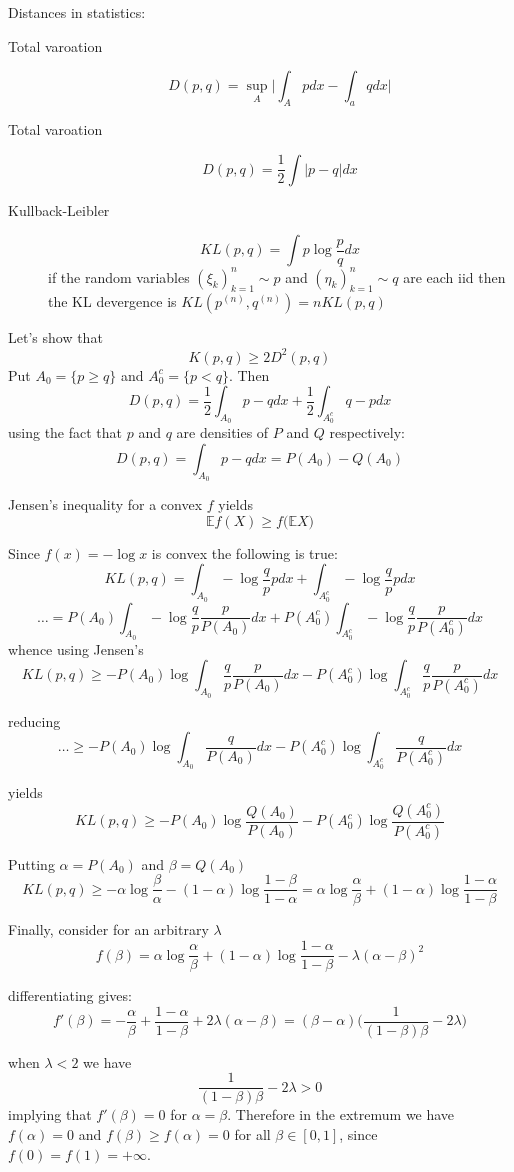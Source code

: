 \documentclass[a4paper]{article}
\newcommand{\Ex}{\mathbb{E}}
\begin{document}
Distances in statistics:
\begin{description}
	\item[Total varoation] \[D(p,q) = \sup_A\Big\lvert \int_A p dx -  \int_a q dx \Big\rvert\]
	\item[Total varoation] \[D(p,q) = \frac{1}{2}\int|p-q| dx\]
	\item[Kullback-Leibler] \[KL(p,q) = \int p\log\frac{p}{q} dx \]
	if the random variables $(\xi_k)_{k=1}^n\sim p$ and $(\eta_k)_{k=1}^n\sim q$ are each iid then the KL devergence is $KL(p^{(n)},q^{(n)}) = n KL(p,q)$
\end{description}

Let's show that
\[K(p,q)\geq 2 D^2(p,q)\]
Put $A_0 = \{ p \geq q \}$ and $A_0^c = \{p < q\}$. Then 
\[D(p,q) = \frac{1}{2}\int_{A_0} p-q dx + \frac{1}{2}\int_{A_0^c} q - p dx \]
using the fact that $p$ and $q$ are densities of $P$ and $Q$ respectively:
\[D(p,q) = \int_{A_0} p-q dx = P(A_0) - Q(A_0)\]

Jensen's inequality for a convex $f$ yields
\[\Ex f(X) \geq f\big(\Ex X\big)\]

Since $f(x) = -\log x$ is convex the following is true:
\[KL(p,q) = \int_{A_0} -\log\frac{q}{p} p dx + \int_{A_0^c} -\log\frac{q}{p} p dx \]
\[\ldots = P(A_0) \int_{A_0} -\log\frac{q}{p} \frac{p}{P(A_0)} dx + P(A_0^c) \int_{A_0^c} -\log\frac{q}{p} \frac{p}{P(A_0^c)} dx \]
whence using Jensen's
\[KL(p,q) \geq  -P(A_0) \log \int_{A_0}\frac{q}{p} \frac{p}{P(A_0)} dx - P(A_0^c) \log \int_{A_0^c} \frac{q}{p} \frac{p}{P(A_0^c)} dx\]

reducing
\[\ldots \geq -P(A_0) \log \int_{A_0}\frac{q}{P(A_0)} dx -P(A_0^c) \log \int_{A_0^c} \frac{q}{P(A_0^c)} dx \]

yields
\[KL(p,q) \geq -P(A_0) \log \frac{Q(A_0)}{P(A_0)} -P(A_0^c) \log \frac{Q(A_0^c)}{P(A_0^c)} \]

Putting $\alpha = P(A_0)$ and $\beta = Q(A_0)$
\[KL(p,q) \geq -\alpha \log \frac{\beta}{\alpha} -(1-\alpha) \log \frac{1-\beta}{1-\alpha} = \alpha \log \frac{\alpha}{\beta} + (1-\alpha) \log \frac{1-\alpha}{1-\beta} \]

Finally, consider for an arbitrary $\lambda$
\[f(\beta) = \alpha \log \frac{\alpha}{\beta} + (1-\alpha) \log \frac{1-\alpha}{1-\beta} - \lambda (\alpha - \beta)^2\]

differentiating gives:
\[f'(\beta) = -\frac{\alpha}{\beta} + \frac{1-\alpha}{1-\beta} + 2\lambda (\alpha - \beta) = (\beta - \alpha)\Big(\frac{1}{(1-\beta)\beta} - 2\lambda\Big)\]

when $\lambda < 2$ we have
\[\frac{1}{(1-\beta)\beta} - 2\lambda > 0\]
implying that $f'(\beta) = 0$ for $\alpha=\beta$.
Therefore in the extremum we have $f(\alpha) = 0$ and $f(\beta)\geq f(\alpha) = 0$ for all $\beta\in [0,1]$, since $f(0)=f(1)=+\infty$.
\end{document}
